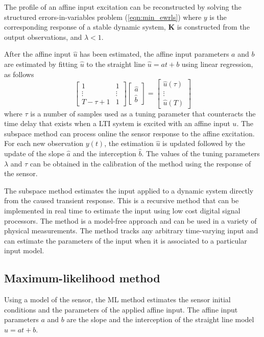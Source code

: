 The profile of an affine input excitation can be reconstructed by solving the structured errors-in-variables problem  (\ref{eqn:min_ewrls}) where $y$ is the corresponding response of a stable dynamic system, $\mathbf{K}$ is constructed from the output observations, and $\lambda<1$.

After the affine input $\widehat{u}$ has been estimated, the affine input parameters $a$ and $b$ are estimated by fitting $\widehat{u}$ to the straight line $\widehat{u} = a t + b$ using linear regression, as follows
\begin{equation} 
  \begin{bmatrix} 1 & 1  \\ \vdots & \vdots \\ T-\tau+1 & 1 \end{bmatrix} 
  \begin{bmatrix} \widehat{a} \\ \widehat{b}  \end{bmatrix} = 
  \begin{bmatrix} \widehat{u}(\tau) \\ \vdots \\ \widehat{u}(T) \end{bmatrix} \label{eqn:LS}
\end{equation}
where $\tau$ is a number of samples used as a tuning parameter that counteracts the time delay that exists when a LTI system is excited with an affine input $u$.
The subspace method can process online the sensor response to the affine excitation.
For each new observation $y(t)$, the estimation $\widehat{u}$ is updated followed by the update of the slope $\widehat{a}$ and the interception $\widehat{b}$.
The values of the tuning parameters $\lambda$ and $\tau$ can be obtained in the calibration of the method using the response of the sensor.

The subspace method estimates the input applied to a dynamic system directly from the caused transient response.
This is a recursive method that can be implemented in real time to estimate the input  using low cost digital signal processors.
The method is a model-free approach and can be used in a variety of physical measurements.
The method  tracks any arbitrary time-varying input and can estimate the parameters of the input when it is associated to a particular input model.



\subsection{Maximum-likelihood method}
Using a model of the sensor, the ML method estimates the sensor initial conditions and the parameters of the applied affine input.
The affine input parameters $a$ and $b$ are the slope and the interception of the straight line model $u = at + b$.

